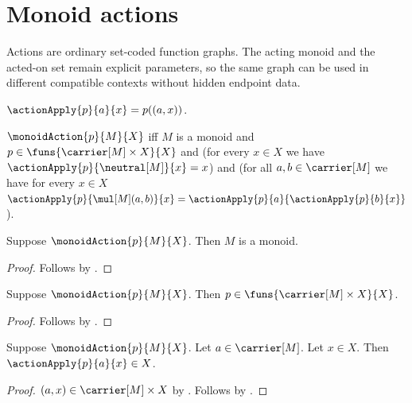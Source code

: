 

\section{Monoid actions}

Actions are ordinary set-coded function graphs.  The acting monoid and the
acted-on set remain explicit parameters, so the same graph can be used in
different compatible contexts without hidden endpoint data.

\begin{abbreviation}\label{action_apply}
    $\actionApply{p}{a}{x}=p((a,x))$.
\end{abbreviation}

\begin{definition}\label{monoid_action}
    $\monoidAction{p}{M}{X}$ iff
        $M$ is a monoid and
        $p\in\funs{\carrier[M]\times X}{X}$ and
        (for every $x\in X$ we have
            $\actionApply{p}{\neutral[M]}{x}=x$) and
        (for all $a,b\in\carrier[M]$ we have for every $x\in X$
            $\actionApply{p}{\mul[M](a,b)}{x}=
                \actionApply{p}{a}{\actionApply{p}{b}{x}}$).
\end{definition}

\begin{proposition}\label{monoid_action_monoid}
    Suppose $\monoidAction{p}{M}{X}$.
    Then $M$ is a monoid.
\end{proposition}
\begin{proof}
    Follows by .
\end{proof}

\begin{proposition}\label{monoid_action_type}
    Suppose $\monoidAction{p}{M}{X}$.
    Then $p\in\funs{\carrier[M]\times X}{X}$.
\end{proposition}
\begin{proof}
    Follows by .
\end{proof}

\begin{proposition}\label{monoid_action_apply_type}
    Suppose $\monoidAction{p}{M}{X}$.
    Let $a\in\carrier[M]$.
    Let $x\in X$.
    Then $\actionApply{p}{a}{x}\in X$.
\end{proposition}
\begin{proof}
    $(a,x)\in\carrier[M]\times X$ by
        .
    Follows by
        .
\end{proof}

